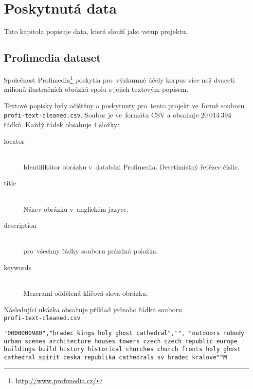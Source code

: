 \chapter{Poskytnutá data}

Tato kapitola popisuje data, která slouží jako vstup projektu.

\section{Profimedia dataset}

Společnost Profimedia\footnote{\url{http://www.profimedia.cz/}} poskytla pro~výzkumné účely korpus více než dvaceti milionů ilustračních obrázků spolu s jejich textovým popisem.

Textové popisky byly očištěny\cite{brno} a poskytnuty pro~tento projekt ve~formě souboru \lstinline{profi-text-cleaned.csv}. Soubor je ve~formátu CSV a obsahuje $20\ 014\ 394$ řádků. Každý řádek obsahuje 4 složky:

\begin{description}

\item[locator] \hfill \\
  Identifikátor obrázku v~databázi Profimedia. Desetimístný řetězec číslic.

\item[title] \hfill \\
  Název obrázku v~anglickém jazyce.

\item[description] \hfill \\
  pro~všechny řádky souboru prázdná položka.

\item[keywords] \hfill \\
  Mezerami oddělená klíčová slova obrázku.

\end{description}

Následující ukázka obsahuje příklad jednoho řádku souboru \\\lstinline{profi-text-cleaned.csv}

\begin{lstlisting}
"0000000980","hradec kings holy ghost cathedral","", "outdoors nobody urban scenes architecture houses towers czech czech republic europe buildings build history historical churches church fronts holy ghost cathedral spirit ceska republika cathedrals sv hradec kralove"^M
\end{lstlisting}

